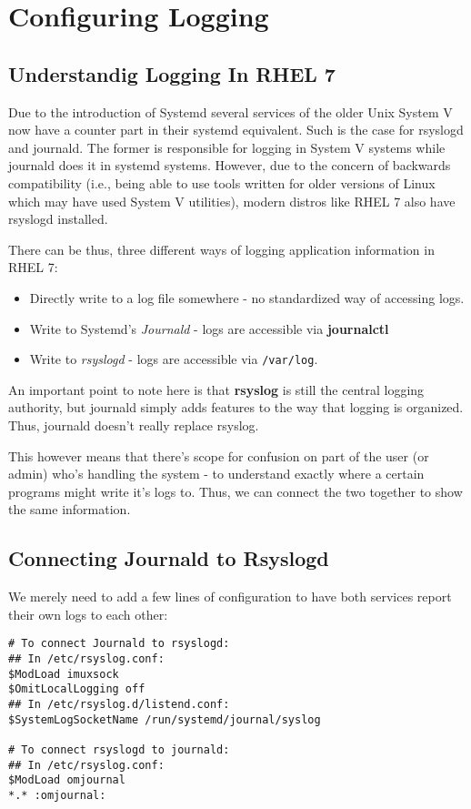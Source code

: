 \chapter{Configuring Logging}

	\section{Understandig Logging In RHEL 7}
Due to the introduction of Systemd several services of the older Unix System V now have a counter part in their systemd equivalent. Such is the case for rsyslogd and journald. The former is responsible for logging in System V systems while journald does it in systemd systems. However, due to the concern of backwards compatibility (i.e., being able to use tools written for older versions of Linux which may have used System V utilities), modern distros like RHEL 7 also have rsyslogd installed. 

There can be thus, three different ways of logging application information in RHEL 7: 
\begin{itemize}
	\item Directly write to a log file somewhere - no standardized way of accessing logs.
	\item Write to Systemd's \textit{Journald} - logs are accessible via \textbf{journalctl}
	\item Write to \textit{rsyslogd} - logs are accessible via \verb|/var/log|.
\end{itemize}

An important point to note here is that \textbf{rsyslog} is still the central logging authority, but journald simply adds features to the way that logging is organized. Thus, journald doesn't really replace rsyslog. 

This however means that there's scope for confusion on part of the user (or admin) who's handling the system - to understand exactly where a certain programs might write it's logs to. Thus, we can connect the two together to show the same information. 

\section{Connecting Journald to Rsyslogd}
We merely need to add a few lines of configuration to have both services report their own logs to each other:

\vspace{-15pt}
\begin{verbatim}
# To connect Journald to rsyslogd:
## In /etc/rsyslog.conf:
$ModLoad imuxsock
$OmitLocalLogging off
## In /etc/rsyslog.d/listend.conf:
$SystemLogSocketName /run/systemd/journal/syslog

# To connect rsyslogd to journald:
## In /etc/rsyslog.conf:
$ModLoad omjournal 
*.* :omjournal:
\end{verbatim}
\vspace{-10pt}	

